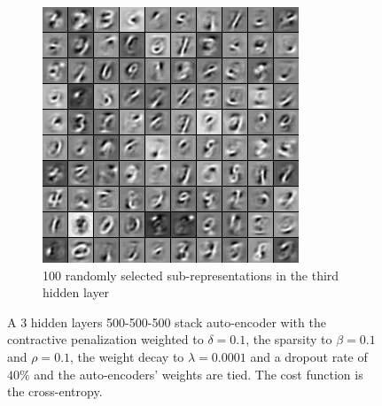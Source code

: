 \documentclass[a4paper,11pt]{report}
\begin{document}
\begin{figure}[H]
\begin{center}
\begin{subfigure}{.7\textwidth}
					\begin{center}
						\includegraphics[width=.6\linewidth]{Images/Experience/3L500_all_layer_2.png}
						\caption{100 randomly selected sub-representations in the third hidden layer}
						\label{fig:500_layer2}
					\end{center}
				\end{subfigure}
				\caption[A 3 hidden layers 500-500-500 stack auto-encoder]{A 3 hidden layers 500-500-500 stack auto-encoder with the contractive penalization weighted to $\delta=0.1$, the sparsity to $\beta=0.1$ and $\rho=0.1$, the weight decay to $\lambda=0.0001$ and a dropout rate of $40\%$ and the auto-encoders' weights are tied. The cost function is the cross-entropy.}
				\label{fig:3L500_500_500}
			\end{center}
		\end{figure}
		
\end{document}
